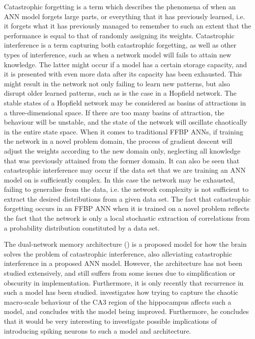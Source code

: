 Catastrophic forgetting \cite{McCloskey1989} is a term which describes the phenomena of when an ANN model forgets large parts, or everything that it has previously learned, i.e. it forgets what it has previously managed to remember to such an extent that the performance is equal to that of randomly assigning its weights. Catastrophic interference is a term capturing both catastrophic forgetting, as well as other types of interference, such as when a network model will fails to attain new knowledge. The latter might occur if a model has a certain storage capacity, and it is presented with even more data after its capacity has been exhausted. This might result in the network not only failing to learn new patterns, but also disrupt older learned patterns, such as is the case in a Hopfield network. The stable states of a Hopfield network may be considered as basins of attractions in a three-dimensional space. If there are too many basins of attraction, the behaviour will be unstable, and the state of the network will oscillate chaotically in the entire state space.
When it comes to traditional FFBP ANNs, if training the network in a novel problem domain, the process of gradient descent will adjust the weights according to the new domain only, neglecting all knowledge that was previously attained from the former domain.
It can also be seen that catastrophic interference may occur if the data set that we are training an ANN model on is sufficiently complex. In this case the network may be exhausted, failing to generalise from the data, i.e. the network complexity is not sufficient to extract the desired distributions from a given data set. 
The fact that catastrophic forgetting occurs in an FFBP ANN when it is trained on a novel problem reflects the fact that the network is only a local stochastic extraction of correlations from a probability distribution constituted by a data set.


The dual-network memory architecture (\cite{McClelland1995}) is a proposed model for how the brain solves the problem of catastrophic interference, also alleviating catastrophic interference in a proposed ANN model. However, the architecture has not been studied extensively, and still suffers from some issues due to simplification or obscurity in implementation. Furthermore, it is only recently that recurrence in such a model has been studied. \cite{Hattori2014} investigates how trying to capture the chaotic macro-scale behaviour of the CA3 region of the hippocampus affects such a model, and concludes with the model being improved. Furthermore, he concludes that it would be very interesting to investigate possible implications of introducing spiking neurons to such a model and architecture.


